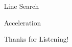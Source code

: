 \documentclass[mathserif,notheorems, hyperref={colorlinks, urlcolor=blue, linkcolor=blue}]{beamer}
\begin{document}
    \begin{frame}{Line Search}
        
    \end{frame}

    \begin{frame}{Acceleration}
        
    \end{frame}


    \begin{frame}{}
        \begin{center}
        \huge Thanks for Listening!
        \end{center}
    \end{frame}

\end{document}
